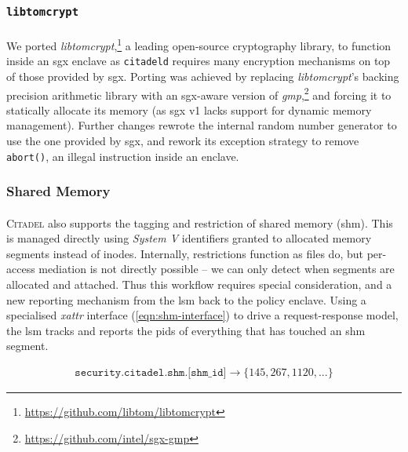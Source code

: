 \subsubsection{\texttt{libtomcrypt}}
\paragraph{} We ported \textit{libtomcrypt},\footnote{\url{https://github.com/libtom/libtomcrypt}} a leading open-source cryptography library, to function inside an \acrshort{sgx} enclave as \texttt{citadeld} requires many encryption mechanisms on top of those provided by \acrshort{sgx}. Porting was achieved by replacing \textit{libtomcrypt}'s backing precision arithmetic library with an \acrshort{sgx}-aware version of \textit{\acrshort{gmp}},\footnote{\url{https://github.com/intel/sgx-gmp}} and forcing it to statically allocate its memory (as \acrshort{sgx} v1 lacks support for dynamic memory management). Further changes rewrote the internal random number generator to use the one provided by \acrshort{sgx}, and rework its exception strategy to remove \texttt{abort()}, an illegal instruction inside an enclave.

\subsubsection{Shared Memory}
\label{sec:shm}
\paragraph{} \textsc{Citadel} also supports the tagging and restriction of shared memory (\acrshort{shm}). This is managed directly using \textit{System V} identifiers granted to allocated memory segments instead of inodes. Internally, restrictions function as files do, but per-access mediation is not directly possible -- we can only detect when segments are allocated and attached. Thus this workflow requires special consideration, and a new reporting mechanism from the \acrshort{lsm} back to the policy enclave. Using a specialised \textit{\acrshort{xattr}} interface (\ref{eqn:shm-interface}) to drive a request-response model, the \acrshort{lsm} tracks and reports the \acrshort{pid}s of everything that has touched an \acrshort{shm} segment. 

\vspace{-8mm}
\begin{align}
    \texttt{security.citadel.shm.[shm\_id]} \longrightarrow \{145, 267, 1120, ...\} \label{eqn:shm-interface}
\end{align}

